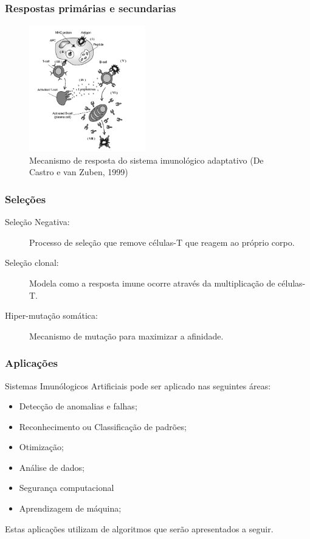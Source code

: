 \documentclass{beamer}
\begin{document}
\begin{frame}
    \frametitle{Respostas primárias e secundarias}
    
    \begin{figure}[!ht]
        \centering
        \includegraphics[width=0.45\textwidth]{resposta}
        \caption{Mecanismo de resposta do sistema imunológico adaptativo (De Castro e van Zuben, 1999)}
    \end{figure}
\end{frame}

\begin{frame}
    \frametitle{Seleções}
    
    \begin{description}
        \item[Seleção Negativa:] Processo de seleção que remove células-T que
        reagem ao próprio corpo.
        \item[Seleção clonal:] Modela como a resposta imune ocorre através da
        multiplicação de células-T.
        \item[Hiper-mutação somática:] Mecanismo de mutação para maximizar a
        afinidade.
    \end{description}
\end{frame}


\begin{frame}
    \frametitle{Aplicações}
    
    Sistemas Imunólogicos Artificiais pode ser aplicado nas seguintes áreas:
    \begin{itemize}
        \item Detecção de anomalias e falhas;
        \item Reconhecimento ou Classificação de padrões;
        \item Otimização;
        \item Análise de dados;
        \item Segurança computacional
        \item Aprendizagem de máquina;
    \end{itemize}
    
    Estas aplicações utilizam de algoritmos que serão apresentados a seguir.
\end{frame}
\end{document}
